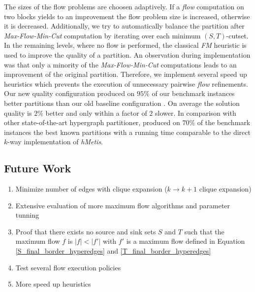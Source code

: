The sizes of the flow problems are choosen adaptively. If a \emph{flow} computation on two blocks
yields to an improvement the flow problem size is increased, otherwise it is decreased. 
Additionally, we try to automatically balance the partition after \emph{Max-Flow-Min-Cut}
computation by iterating over each minimum $(S,T)$-cutset. In the remaining levels, 
where no flow is performed, the classical \emph{FM} heuristic is used to improve the quality 
of a partition. An observation during implementation was that only a minority of 
the \emph{Max-Flow-Min-Cut} computations leads to an improvement of the original partition. 
Therefore, we implement several speed up heuristics which prevents the
execution of unnecessary pairwise \emph{flow} refinements. \\
Our new quality configuration  produced on $95\%$ of our benchmark instances
better partitions than our old baseline configuration . On average the solution 
quality is $2\%$ better and only within a factor of $2$ slower. In comparison with other 
state-of-the-art hypergraph partitioner,  produced on $70\%$ of the benchmark instances
the best known partitions with a running time comparable to the direct $k$-way implementation
of \emph{hMetis}.


\subsection{Future Work}

 \begin{enumerate}
\item Minimize number of edges with clique expansion ($k \rightarrow k + 1$ clique
      expansion)
\item Extensive evaluation of more maximum flow algorithms and parameter tunning
\item Proof that there exists no source and sink sets $S$ and $T$ such that the maximum
      flow $f$ is $|f| < |f'|$ with $f'$ is a maximum flow defined in Equation \ref{S_final_border_hyperedges}
      and \ref{T_final_border_hyperedges}
\item Test several flow execution policies
\item More speed up heuristics
 \end{enumerate}